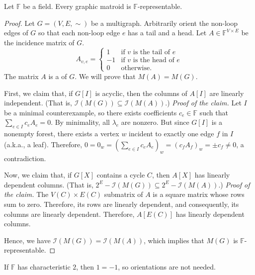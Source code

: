 \begin{proposition}
    Let \(\mathbb{F}\) be a field.
    Every graphic matroid is \(\mathbb{F}\)-representable.
\end{proposition}

\begin{proof}
    Let \(G = (V, E, \sim)\) be a multigraph.
    Arbitrarily orient the non-loop edges of \(G\) so that each non-loop edge \(e\) has a tail and a head.
    Let \(A \in \mathbb{F}^{V \times E}\) be the incidence matrix of \(G\).
    \begin{equation}
        A_{v, e} = \begin{cases}
            1 & \text{if } v \text{ is the tail of } e \\
            -1 & \text{if } v \text{ is the head of } e \\
            0 & \text{otherwise.}
        \end{cases}
    \end{equation}
    The matrix \(A\) is a  of \(G\).
    We will prove that \(M(A) = M(G)\).

    First, we claim that, if \(G[I]\) is acyclic, then the columns of \(A[I]\) are linearly independent. (That is, \(\mathcal{I}(M(G)) \subseteq \mathcal{I}(M(A))\).)
    \textit{Proof of the claim.}
    Let \(I\) be a minimal counterexample, so there exists coefficients \(c_e \in \mathbb{F}\) such that \(\sum_{e \in I} c_e A_{e} = 0\).
    By minimality, all \(\lambda_e\) are nonzero.
    But since \(G[I]\) is a nonempty forest, there exists a vertex \(w\) incident to exactly one edge \(f\) in \(I\) (a.k.a., a leaf).
    Therefore, \(0 = 0_w = (\sum_{e \in I} c_e A_{e})_{w} = (c_fA_{f})_w = \pm c_f \neq 0\), a contradiction.

    Now, we claim that, if \(G[X]\) contains a cycle \(C\), then \(A[X]\) has linearly dependent columns. (That is, \(2^E - \mathcal{I}(M(G)) \subseteq 2^E - \mathcal{I}(M(A))\).)
    \textit{Proof of the claim.}
    The \(V(C) \times E(C)\) submatrix of \(A\) is a square matrix whose rows sum to zero.
    Therefore, its rows are linearly dependent, and consequently, its columns are linearly dependent.
    Therefore, \(A[E(C)]\) has linearly dependent columns.

    Hence, we have \(\mathcal{I}(M(G)) = \mathcal{I}(M(A))\), which implies that \(M(G)\) is \(\mathbb{F}\)-representable.
\end{proof}

\begin{note}
    If \(\mathbb{F}\) has characteristic \(2\), then \(1 = -1\), so orientations are not needed.
\end{note}

